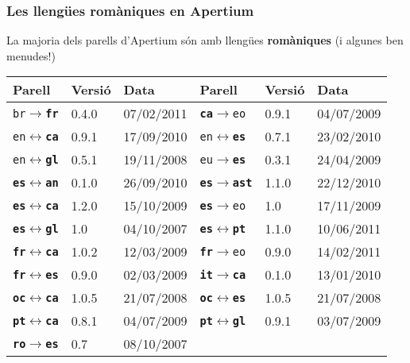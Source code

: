 \documentclass{beamer}
\newcommand{\Pair}[2]{\texttt{#1}\(\leftrightarrow\)\texttt{#2}}
\newcommand{\pair}[2]{\texttt{#1}\(\to\)\texttt{#2}}
\begin{document}
\begin{frame}
  \frametitle{Les llengües romàniques en Apertium}
La majoria dels parells d'Apertium són amb llengües \textbf{romàniques} (i algunes ben menudes!)
  \begin{tabular}{|lll|lll|}
\hline
\textbf{Parell}&\textbf{Versió}&\textbf{Data}&\textbf{Parell}&\textbf{Versió}&\textbf{Data}\\
\hline
    \pair{br}{\textbf{fr}}&0.4.0&07/02/2011&
    \pair{\textbf{ca}}{eo}&0.9.1&04/07/2009\\
    \Pair{en}{\textbf{ca}}&0.9.1&17/09/2010&
    \Pair{en}{\textbf{es}}&0.7.1&23/02/2010\\
    \Pair{en}{\textbf{gl}}&0.5.1&19/11/2008&
    \pair{eu}{\textbf{es}}&0.3.1&24/04/2009\\
    \Pair{\textbf{es}}{\textbf{an}}&0.1.0&26/09/2010&
    \pair{\textbf{es}}{\textbf{ast}}&1.1.0&22/12/2010\\
    \Pair{\textbf{es}}{\textbf{ca}}&1.2.0&15/10/2009&
    \pair{\textbf{es}}{eo}&1.0&17/11/2009\\
    \Pair{\textbf{es}}{\textbf{gl}}&1.0&04/10/2007&
    \Pair{\textbf{es}}{\textbf{pt}}&1.1.0&10/06/2011\\
    \Pair{\textbf{fr}}{\textbf{ca}}&1.0.2&12/03/2009&
    \pair{\textbf{fr}}{eo}&0.9.0&14/02/2011\\
    \Pair{\textbf{fr}}{\textbf{es}}&0.9.0&02/03/2009&
    \pair{\textbf{it}}{\textbf{ca}}&0.1.0&13/01/2010\\
    \Pair{\textbf{oc}}{\textbf{ca}}&1.0.5&21/07/2008&
    \Pair{\textbf{oc}}{\textbf{es}}&1.0.5&21/07/2008\\
    \Pair{\textbf{pt}}{\textbf{ca}}&0.8.1&04/07/2009&
    \Pair{\textbf{pt}}{\textbf{gl}}&0.9.1&03/07/2009\\
    \pair{\textbf{ro}}{\textbf{es}}&0.7&08/10/2007 \\
\hline
  \end{tabular}



\end{frame}




\end{document}
